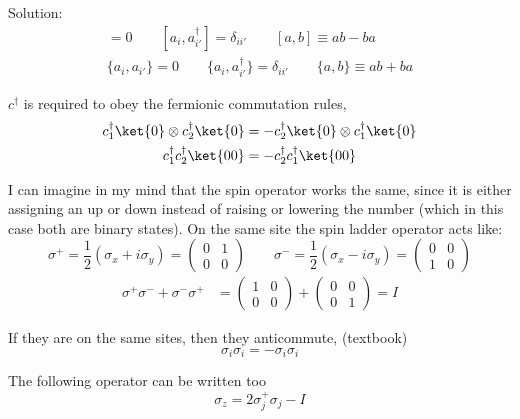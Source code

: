 \begin{homeworkProblem}
\begin{callout}{Solution:}
\begin{gather*}
    [a_i,a_{i'}] = 0 \qquad [a_i,a^\dagger_{i'}] = \delta_{ii'} \qquad [a,b]\equiv ab-ba \\
    \{a_i,a_{i'}\} = 0 \qquad \{a_i,a^\dagger_{i'}\} = \delta_{ii'} \qquad \{a,b\} \equiv ab+ba
\end{gather*}

$c^\dagger$ is required to obey the fermionic commutation rules, 
\begin{align*}
    c_1^{\dagger} \ket{0} \otimes c_2^{\dagger} \ket{0} &= - c_{2}^{\dagger}\ket{0} \otimes c_{1}^{\dagger}\ket{0} \\
    c_{1}^{\dagger}c_{2}^{\dagger}\ket{00} &= - c_{2}^{\dagger}c_{1}^{\dagger}\ket{00}
\end{align*}

I can imagine in my mind that the spin operator works the same, since it is either assigning an up or down instead of raising or lowering the number (which in this case both are binary states). On the same site the spin ladder operator acts like:
$$\sigma^+= \frac{1}{2}(\sigma_x + i \sigma_y) =\begin{pmatrix} 0 & 1 \\ 0 & 0 \end{pmatrix} \qquad \sigma^-= \frac{1}{2}(\sigma_x - i \sigma_y) =\begin{pmatrix} 0 & 0 \\ 1 & 0 \end{pmatrix}$$
\begin{align*}
    \sigma^{+} \sigma^{-} + \sigma^{-}\sigma^{+} &=\begin{pmatrix} 1 & 0 \\ 0 & 0 \end{pmatrix} +\begin{pmatrix} 0 & 0 \\ 0 & 1 \end{pmatrix} = I
\end{align*}

If they are on the same sites, then they anticommute, (textbook)
$$\sigma_{i}\sigma_{i}=-\sigma_{i}\sigma_{i}$$

The following operator can be written too
$$\sigma_z = 2 \sigma_j^+ \sigma_j - I$$


\end{callout}
\end{homeworkProblem}
